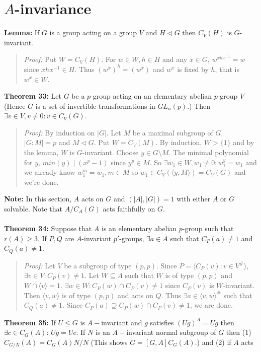 \section {$A$-invariance}
{\bf Lemma:}
If $G$ is a group acting on a group $V$ and $H \lhd G$ then $C_V(H)$ is $G$-invariant.
\begin{quote}
\emph{Proof:}  
Put $W= C_V(H)$.  For $w \in W, h \in H$ and any $x \in G$, $w^{xhx^{-1}} = w$ since
$xhx^{-1} \in H$.  Thus  $(w^x)^h = (w^x)$ and $w^x$ is fixed by $h$, that is $w^x \in W$.
\end{quote}
{\bf Theorem 33:}
Let $G$ be a $p$-group acting on an elementary abelian $p$-group $V$ (Hence $G$ is a set of
invertible transformations in $GL_n(p)$.)  Then $\exists v \in V, v \ne 0: v \in C_V(G)$.
\begin{quote}
\emph{Proof:}  
By induction on $|G|$.  Let $M$ be a maximal subgroup of $G$.  $|G:M|= p$ and $M \lhd G$.
Put $W= C_V(M)$.  By induction, $W > \{1 \}$ and by the lemma, $W$ is $G$-invariant.
Choose $y \in G \setminus M$.  The minimal polynomial for $y$, $min(y) \mid (x^p-1)$ since
$y^p \in M$.  So $\exists w_1 \in W, w_1 \ne 0: w_1^y = w_1$ and we already know
$w_1^m = w_1, m \in M$ so $w_1 \in C_V( \langle y, M \rangle)= C_V(G)$ and we're done.
\end{quote}
{\bf Note:} In this section, $A$ acts on $G$ and $(|A|, |G|)=1$ with either
$A$ or $G$ solvable.  Note that $A/C_A(G)$ acts faithfully on $G$.
\\
\\
{\bf Theorem 34:}
Suppose that $A$ is an elementary abelian $p$-group such that $r(A) \ge 3$.  If $P, Q$ are
$A$-invariant $p'$-groups, $\exists a \in A$ such that
$C_P(a) \ne 1$ and $C_Q(a) \ne 1$.
\begin{quote}
\emph{Proof:}  
Let $V$ be a subgroup of type $(p, p)$.  Since
$P= \langle C_P(v): v \in V^{\#} \rangle$, $\exists v \in V: C_P(v) \ne 1$.  Let
$W \subseteq A$ such that $W$ is of type $(p, p)$ and $W \cap \langle v \rangle = 1$.
$\exists w \in W: C_P(w) \cap C_P(v) \ne 1$ since $C_P(v)$ is $W$-invariant.
Then $\langle v, w \rangle$ is of type $(p, p)$ and acts on $Q$.  
Thus $\exists a \in \langle v, w \rangle^{\#}$ such that  $C_Q(a) \ne 1$.
Since $C_P(a) \supseteq C_P(w) \cap C_P(v) \ne 1$, we are done.
\end{quote}
{\bf Theorem 35:}
If $U \leq G$ is $A-$invariant and $g$ satisfies $(Ug)^A=Ug$ then
$\exists c \in C_G(A)$: $Ug=Uc$. If $N$ is an $A-$invariant normal subgroup of $G$ then
(1) $C_{G/N}(A)= C_G(A)N/N$ (This shows $G=[G,A]C_G(A)$.) and (2) if $A$ acts
